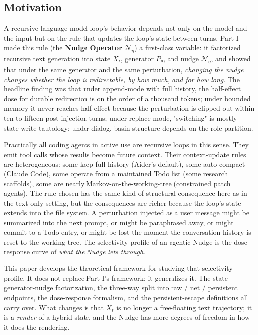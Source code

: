 \documentclass{article}
\theoremstyle{plain}
\theoremstyle{definition}
\begin{document}
\subsection{Motivation}

A recursive language-model loop's behavior depends not only on the model and the input but on the rule that updates the loop's state between turns. Part I made this rule (the \textbf{Nudge Operator} $\mathcal{N}_\eta$) a first-class variable: it factorized recursive text generation into state $X_t$, generator $P_\theta$, and nudge $\mathcal{N}_\eta$, and showed that under the same generator and the same perturbation, \textit{changing the nudge changes whether the loop is redirectable, by how much, and for how long}. The headline finding was that under append-mode with full history, the half-effect dose for durable redirection is on the order of a thousand tokens; under bounded memory it never reaches half-effect because the perturbation is clipped out within ten to fifteen post-injection turns; under replace-mode, "switching" is mostly state-write tautology; under dialog, basin structure depends on the role partition.

Practically all coding agents in active use are recursive loops in this sense. They emit tool calls whose results become future context. Their context-update rules are heterogeneous: some keep full history (Aider's default), some auto-compact (Claude Code), some operate from a maintained Todo list (some research scaffolds), some are nearly Markov-on-the-working-tree (constrained patch agents). The rule chosen has the same kind of structural consequence here as in the text-only setting, but the consequences are richer because the loop's state extends into the file system. A perturbation injected as a user message might be summarized into the next prompt, or might be paraphrased away, or might commit to a Todo entry, or might be lost the moment the conversation history is reset to the working tree. The selectivity profile of an agentic Nudge is the dose-response curve of \textit{what the Nudge lets through}.

This paper develops the theoretical framework for studying that selectivity profile. It does not replace Part I's framework; it generalizes it. The state-generator-nudge factorization, the three-way split into raw / net / persistent endpoints, the dose-response formalism, and the persistent-escape definitions all carry over. What changes is that $X_t$ is no longer a free-floating text trajectory; it is a \textit{render} of a hybrid state, and the Nudge has more degrees of freedom in how it does the rendering.
\end{document}
